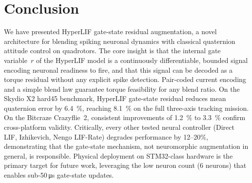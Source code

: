 \documentclass[conference]{IEEEtran}
\begin{document}
\section{Conclusion}
\label{sec:conclusion}

We have presented HyperLIF gate-state residual augmentation, a novel
architecture for blending spiking neuronal dynamics with classical quaternion
attitude control on quadrotors.
The core insight is that the internal gate variable~$r$ of the HyperLIF model
is a continuously differentiable, bounded signal encoding neuronal readiness to
fire, and that this signal can be decoded as a torque residual without any
explicit spike detection.
Pair-coded current encoding and a simple blend law guarantee torque feasibility
for any blend ratio.
On the Skydio X2 hard45 benchmark, HyperLIF gate-state residual reduces mean
quaternion error by \SI{6.4}{\percent}, reaching \SI{8.1}{\percent} on the
full three-axis tracking mission.
On the Bitcraze Crazyflie~2, consistent improvements of \SI{1.2}{\percent}
to \SI{3.3}{\percent} confirm cross-platform validity.
Critically, every other tested neural controller (Direct LIF, Izhikevich,
Nengo LIF-Rate) degrades performance by 12--20\%, demonstrating that the
gate-state mechanism, not neuromorphic augmentation in general, is responsible.
Physical deployment on STM32-class hardware is the primary target for future
work, leveraging the low neuron count (6 neurons) that enables sub-50\,\si{\micro\second}
gate-state updates.



\end{document}

